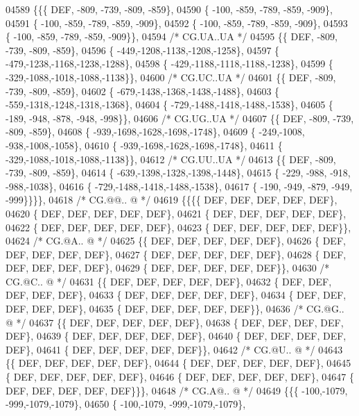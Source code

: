 \begin{DoxyCode}
04589 \{\{\{  DEF, -809, -739, -809, -859\},
04590 \{ -100, -859, -789, -859, -909\},
04591 \{ -100, -859, -789, -859, -909\},
04592 \{ -100, -859, -789, -859, -909\},
04593 \{ -100, -859, -789, -859, -909\}\},
04594 \textcolor{comment}{/* CG.UA..UA */}
04595 \{\{  DEF, -809, -739, -809, -859\},
04596 \{ -449,-1208,-1138,-1208,-1258\},
04597 \{ -479,-1238,-1168,-1238,-1288\},
04598 \{ -429,-1188,-1118,-1188,-1238\},
04599 \{ -329,-1088,-1018,-1088,-1138\}\},
04600 \textcolor{comment}{/* CG.UC..UA */}
04601 \{\{  DEF, -809, -739, -809, -859\},
04602 \{ -679,-1438,-1368,-1438,-1488\},
04603 \{ -559,-1318,-1248,-1318,-1368\},
04604 \{ -729,-1488,-1418,-1488,-1538\},
04605 \{ -189, -948, -878, -948, -998\}\},
04606 \textcolor{comment}{/* CG.UG..UA */}
04607 \{\{  DEF, -809, -739, -809, -859\},
04608 \{ -939,-1698,-1628,-1698,-1748\},
04609 \{ -249,-1008, -938,-1008,-1058\},
04610 \{ -939,-1698,-1628,-1698,-1748\},
04611 \{ -329,-1088,-1018,-1088,-1138\}\},
04612 \textcolor{comment}{/* CG.UU..UA */}
04613 \{\{  DEF, -809, -739, -809, -859\},
04614 \{ -639,-1398,-1328,-1398,-1448\},
04615 \{ -229, -988, -918, -988,-1038\},
04616 \{ -729,-1488,-1418,-1488,-1538\},
04617 \{ -190, -949, -879, -949, -999\}\}\}\},
04618 \textcolor{comment}{/* CG.@@.. @ */}
04619 \{\{\{\{  DEF,  DEF,  DEF,  DEF,  DEF\},
04620 \{  DEF,  DEF,  DEF,  DEF,  DEF\},
04621 \{  DEF,  DEF,  DEF,  DEF,  DEF\},
04622 \{  DEF,  DEF,  DEF,  DEF,  DEF\},
04623 \{  DEF,  DEF,  DEF,  DEF,  DEF\}\},
04624 \textcolor{comment}{/* CG.@A.. @ */}
04625 \{\{  DEF,  DEF,  DEF,  DEF,  DEF\},
04626 \{  DEF,  DEF,  DEF,  DEF,  DEF\},
04627 \{  DEF,  DEF,  DEF,  DEF,  DEF\},
04628 \{  DEF,  DEF,  DEF,  DEF,  DEF\},
04629 \{  DEF,  DEF,  DEF,  DEF,  DEF\}\},
04630 \textcolor{comment}{/* CG.@C.. @ */}
04631 \{\{  DEF,  DEF,  DEF,  DEF,  DEF\},
04632 \{  DEF,  DEF,  DEF,  DEF,  DEF\},
04633 \{  DEF,  DEF,  DEF,  DEF,  DEF\},
04634 \{  DEF,  DEF,  DEF,  DEF,  DEF\},
04635 \{  DEF,  DEF,  DEF,  DEF,  DEF\}\},
04636 \textcolor{comment}{/* CG.@G.. @ */}
04637 \{\{  DEF,  DEF,  DEF,  DEF,  DEF\},
04638 \{  DEF,  DEF,  DEF,  DEF,  DEF\},
04639 \{  DEF,  DEF,  DEF,  DEF,  DEF\},
04640 \{  DEF,  DEF,  DEF,  DEF,  DEF\},
04641 \{  DEF,  DEF,  DEF,  DEF,  DEF\}\},
04642 \textcolor{comment}{/* CG.@U.. @ */}
04643 \{\{  DEF,  DEF,  DEF,  DEF,  DEF\},
04644 \{  DEF,  DEF,  DEF,  DEF,  DEF\},
04645 \{  DEF,  DEF,  DEF,  DEF,  DEF\},
04646 \{  DEF,  DEF,  DEF,  DEF,  DEF\},
04647 \{  DEF,  DEF,  DEF,  DEF,  DEF\}\}\},
04648 \textcolor{comment}{/* CG.A@.. @ */}
04649 \{\{\{ -100,-1079, -999,-1079,-1079\},
04650 \{ -100,-1079, -999,-1079,-1079\},

\end{DoxyCode}
